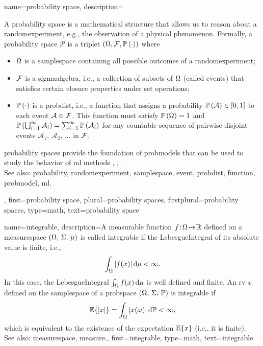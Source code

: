 {name={probability space}, 
 	description={A \gls{probability} space is a mathematical 
 		structure that allows us to reason about a \gls{randomexperiment}, e.g., 
		the observation of a physical phenomenon. 
 	   	Formally, a \gls{probability} space $\mathcal{P}$ is a triplet 
		$(\Omega, \mathcal{F}, \mathbb{P}\left(\cdot\right))$ where
 		\begin{itemize} 
 			\item  $\Omega$ is a \gls{samplespace} containing all possible \glspl{outcome} 
			of a \gls{randomexperiment};
 			\item  $\mathcal{F}$ is a \gls{sigmaalgebra}, i.e., a collection of subsets of 
			$\Omega$ (called \glspl{event}) that satisfies certain closure properties 
			under set operations;
 			\item $\mathbb{P}\left(\cdot\right)$ is a \gls{probdist}, i.e., a \gls{function} that assigns 
			a \gls{probability} $\mathbb{P}\left(\mathcal{A}\right) \in [0,1]$ to each \gls{event} $\mathcal{A} 
			\in \mathcal{F}$. This \gls{function} must satisfy $\mathbb{P}\left(\Omega\right) = 1$ and 
			$\mathbb{P}\left(\bigcup_{i=1}^{\infty} \mathcal{A}_i\right) = \sum_{i=1}^{\infty} \mathbb{P}\left(\mathcal{A}_i\right)$ 
			for any \gls{countable} \gls{sequence} of pairwise disjoint \glspl{event} $\mathcal{A}_1, \,\mathcal{A}_2, \,\ldots$ in $\mathcal{F}$.
 		\end{itemize}
 		\Gls{probability} spaces provide the foundation of \glspl{probmodel} 
		that can be used to study the behavior of \gls{ml} methods \cite{BillingsleyProbMeasure}, \cite{GrayProbBook}, \cite{ross2013first}.
				\\
		See also: \gls{probability}, \gls{randomexperiment}, \gls{samplespace}, \gls{event}, \gls{probdist}, \gls{function}, \gls{probmodel}, \gls{ml}.},  
 	first={probability space}, 
	plural={probability spaces},
	firstplural={probability spaces},
	type=math, 
 	text={probability space}
}

{name={integrable},
	description={A \gls{measurable} \gls{function} $f\!:\!\Omega \!\to\! \mathbb{R}$ 
		defined on a \gls{measurespace} $(\Omega, \,\Sigma, \,\mu)$ 
		is called integrable if the \gls{LebesgueIntegral} 
		of its absolute value is finite, i.e.,
		\[
		\int_{\Omega} |f(x)|\,\mathrm{d}\mu < \infty.
		\]
		In this case, the \gls{LebesgueIntegral} $\int_{\Omega} f(x)\,\mathrm{d}\mu$ 
		is well defined and finite. An \gls{rv} $x$ defined on the \gls{samplespace} 
		of a \gls{probspace} $(\Omega, \,\Sigma, \,\mathbb{P})$ 
		is integrable if
		\[
		\mathbb{E}\{|x|\}
		= \int_{\Omega} |x(\omega)|\,\mathrm{d}\mathbb{P} 
		< \infty,
		\]
		which is equivalent to the existence of the \gls{expectation} $\mathbb{E}\{x\}$ (i.e., it is finite). 
		\\ 
		See also: \gls{measurespace}, \gls{measure}.},
	first={integrable},
	type=math, 
	text={integrable}
}

